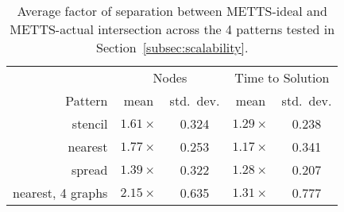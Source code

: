 \begin{table}[t]
\color{blue}
\centering
\small
\begin{tabular}{r | c | c | c | c}
        & \multicolumn{2}{|c|}{Nodes} & \multicolumn{2}{|c}{Time to Solution} \\
Pattern & mean & std.~dev. & mean & std.~dev. \\
\hline
stencil & $1.61\times$ & 0.324 & $1.29\times$ & 0.238 \\
nearest & $1.77\times$ & 0.253 & $1.17\times$ & 0.341 \\
spread  & $1.39\times$ & 0.322 & $1.28\times$ & 0.207 \\
nearest, 4 graphs & $2.15\times$ & 0.635 & $1.31\times$ & 0.777
\end{tabular}

\vspace{-0.20cm}
\caption{\color{blue} Average factor of separation between METTS-ideal and METTS-actual intersection across the 4 patterns tested in Section~\ref{subsec:scalability}.\label{tab:metg-predict-strong}}
\vspace{-0.5cm}
\end{table}

